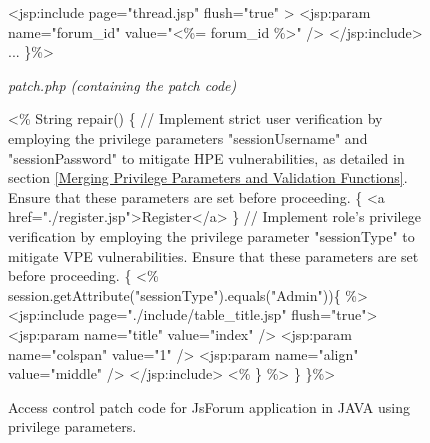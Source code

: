 \documentclass[10pt,journal,compsoc]{IEEEtran}
\begin{document}
\begin{CJK}{UTF8}{gbsn}
\begin{figure*}
\begin{minipage}[t]{0.48\textwidth}
\begin{algorithm}[H]
\begin{algorithmic}[1]
   \State \textless jsp:include page="thread.jsp" flush="true" \textgreater 
      \State \textless jsp:param name="forum\_id" value="\textless\%= forum\_id \%\textgreater " /\textgreater 
   \State \textless/jsp:include\textgreater 
\EndIf
\State ...
\State \}\%\textgreater 
\end{algorithmic}
\end{algorithm}
\end{minipage}
\hfill
\begin{minipage}[t]{1\textwidth}
\begin{algorithm}[H]
\small
\renewcommand{\thealgorithm}{}
\caption{\textit{patch.php (containing the patch code)}}
\begin{algorithmic}[1]
\State \textless\%
\State String repair() \{
    \Statex \textcolor[rgb]{0.16,0.32,0.66}{// Implement strict user verification by employing the privilege parameters "sessionUsername" and "sessionPassword" to mitigate HPE vulnerabilities, as detailed in section \ref{Merging Privilege Parameters and Validation Functions}. Ensure that these parameters are set before proceeding.}
    \{
    \State \textless a href="./register.jsp"\textgreater Register\textless/a\textgreater 
    \State \}
    \EndIf
    \Statex \textcolor[rgb]{0.16,0.32,0.66}{// Implement role's privilege verification by employing the privilege parameter "sessionType" to mitigate VPE vulnerabilities. Ensure that these parameters are set before proceeding.}
    \{
    \State \textless\% session.getAttribute("sessionType").equals("Admin"))\{ \%\textgreater 
        \State \textless jsp:include page="./include/table\_title.jsp" flush="true"\textgreater 
        \State \textless jsp:param name="title" value="index" /\textgreater 
        \State \textless jsp:param name="colspan" value="1" /\textgreater 
        \State \textless jsp:param name="align" value="middle" /\textgreater 
        \State\textless/jsp:include\textgreater 
    \State \textless\% \} \%\textgreater 
    \State \}
    \EndIf
\State \}\%\textgreater

\end{algorithmic}
\end{algorithm}
\end{minipage}%
\caption{Access control patch code for JsForum application in JAVA using privilege parameters.}
\label{JsForum}
\end{figure*}

\end{CJK}
\end{document}
